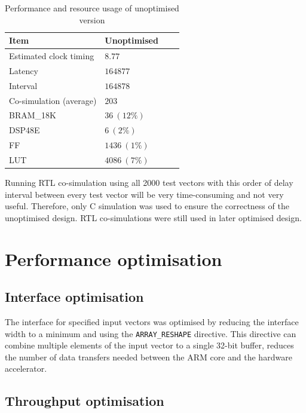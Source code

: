 \documentclass[journal]{IEEEtran}
\begin{document}
\begin{table}[ht]
	\renewcommand{\arraystretch}{1.3}
	\caption{Performance and resource usage of unoptimised version}
	\label{tbl:res_unopt}
	\centering
	\begin{tabular}{llll}
		\hline
		Item			& Unoptimised	\\
		\hline
		Estimated clock timing	& $8.77$	\\
		Latency			& $164877$	\\
		Interval		& $164878$	\\
		Co-simulation (average)	& $203$		\\
		\hline
		BRAM\_18K		& $36~(12\%)$	\\
		DSP48E			& $6~(2\%)$	\\
		FF			& $1436~(1\%)$	\\
		LUT			& $4086~(7\%)$	\\
		\hline
	\end{tabular}
\end{table}

Running RTL co-simulation using all 2000 test vectors with this order of delay interval between every test vector will be very time-consuming and not very useful. Therefore, only C simulation was used to ensure the correctness of the unoptimised design. RTL co-simulations were still used in later optimised design.

\section{Performance optimisation}

\subsection{Interface optimisation}

The interface for specified input vectors was optimised by reducing the interface width to a minimum and using the \texttt{ARRAY\_RESHAPE} directive. This directive can combine multiple elements of the input vector to a single 32-bit buffer, reduces the number of data transfers needed between the ARM core and the hardware accelerator.

\subsection{Throughput optimisation}
\end{document}
